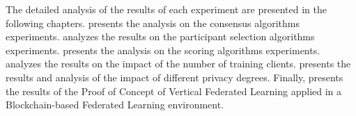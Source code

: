 The detailed analysis of the results of each experiment are presented in the following chapters.  presents the analysis on the consensus algorithms experiments.  analyzes the results on the participant selection algorithms experiments.  presents the analysis on the scoring algorithms experiments.  analyzes the results on the impact of the number of training clients.  presents the results and analysis of the impact of different privacy degrees. Finally,  presents the results of the Proof of Concept of Vertical Federated Learning applied in a Blockchain-based Federated Learning environment.

